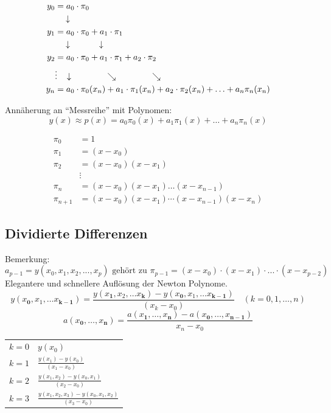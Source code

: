 \begin{minipage}[t]{7.5cm}
	\begin{align}
		y_0 &= a_0\cdot \pi_0 \nonumber\\
		&\quad \downarrow\nonumber\\
		y_1 &= a_0\cdot \pi_0 +a_1\cdot\pi_1 \nonumber\\
		&\quad \downarrow \hspace{1.2cm}\downarrow\nonumber\\
		y_2 &= a_0\cdot \pi_0 +a_1\cdot\pi_1  +a_2\cdot\pi_2  \nonumber\\
		&\vdots\hspace{0.3cm}\downarrow \hspace{1.5cm}\searrow\hspace{1.5cm}\searrow\nonumber\\
		y_n &= a_0\cdot \pi_0(x_n) +a_1\cdot\pi_1(x_n)  +a_2\cdot\pi_2(x_n)+\ldots+ a_n\pi_n(x_n) \nonumber
	\end{align}

	Annäherung an ``Messreihe'' mit Polynomen: $$y(x)\approx p(x) = a_0 \pi_0(x) + a_1 \pi_1(x) + \ldots+ a_{n} \pi_{n}(x)$$
\end{minipage}
\hfill
\begin{minipage}[t]{11.5cm}
	\begin{align}
		\pi_0 &= 1 \nonumber\\
		\pi_1 &= (x-x_0) \nonumber\\
		\pi_2 &= (x-x_0)(x-x_1) \nonumber\\
		&\vdots \nonumber\\
		\pi_n &= (x-x_0)(x-x_1)\ldots(x-x_{n-1}) \nonumber\\
		\pi_{n+1} &= (x-x_0)(x-x_1)\cdots(x-x_{n-1})(x-x_n) \nonumber
	\end{align}	
\end{minipage}
\subsection{Dividierte Differenzen}
Bemerkung:
\[
	a_{p-1} = y(x_0,x_1,x_2, ... , x_p) \text{ gehört zu } \pi_{p-1}=(x-x_0)\cdot(x-x_1)\cdot ... \cdot (x-x_{p-2})
\]
Elegantere und schnellere Auflösung der Newton Polynome.
$$y(x_\mathbf{0}, x_1, \ldots x_\mathbf{k-1}) = \frac{y(x_\mathbf{1},x_2,\ldots x_\mathbf{k})-y(x_\mathbf{0},x_1,\ldots x_{\mathbf{k-1}})}{(x_k-x_0)} \quad (k=0,1,\ldots,n)$$
$$a(x_\mathbf{0},\ldots,x_\mathbf{n})=\frac{a(x_\mathbf{1},\ldots,x_\mathbf{n})-a(x_\mathbf{0},\ldots,x_{\mathbf{n-1}})}{x_n-x_0}$$
\begin{tabular}{ll}
$k=0$ &$y(x_0)$ \\[0.2cm]
$k=1$ &$\frac{y(x_1)-y(x_0)}{(x_1-x_0)}$\\[0.2cm]
$k=2$ &$\frac{y(x_1,x_2)-y(x_0,x_1)}{(x_2-x_0)}$\\[0.2cm]
$k=3$ &$\frac{y(x_1,x_2,x_3)-y(x_0,x_1,x_2)}{(x_3-x_0)}$\\
\end{tabular}\\
\\

